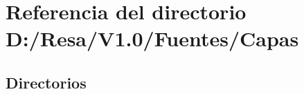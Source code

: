 \section{Referencia del directorio D\+:/\+Resa/\+V1.0/\+Fuentes/\+Capas}
\label{dir_d2fc15ab2ac0b9657bfd25c4a2b1c95c}
\subsection*{Directorios}
\begin{DoxyCompactItemize}
\end{DoxyCompactItemize}
